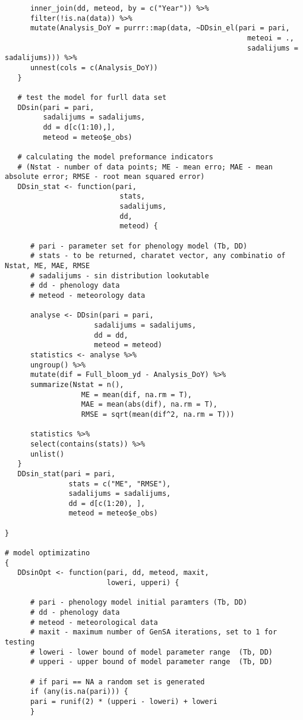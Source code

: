 \begin{verbatim}
      inner_join(dd, meteod, by = c("Year")) %>%
      filter(!is.na(data)) %>%
      mutate(Analysis_DoY = purrr::map(data, ~DDsin_el(pari = pari,
                                                         meteoi = .,
                                                         sadalijums = sadalijums))) %>%
      unnest(cols = c(Analysis_DoY))
   }

   # test the model for furll data set
   DDsin(pari = pari,
         sadalijums = sadalijums,
         dd = d[c(1:10),],
         meteod = meteo$e_obs)

   # calculating the model preformance indicators
   # (Nstat - number of data points; ME - mean erro; MAE - mean absolute error; RMSE - root mean squared error)
   DDsin_stat <- function(pari,
                           stats,
                           sadalijums,
                           dd,
                           meteod) {

      # pari - parameter set for phenology model (Tb, DD)
      # stats - to be returned, charatet vector, any combinatio of Nstat, ME, MAE, RMSE
      # sadalijums - sin distribution lookutable
      # dd - phenology data
      # meteod - meteorology data

      analyse <- DDsin(pari = pari,
                     sadalijums = sadalijums,
                     dd = dd,
                     meteod = meteod)
      statistics <- analyse %>%
      ungroup() %>%
      mutate(dif = Full_bloom_yd - Analysis_DoY) %>%
      summarize(Nstat = n(),
                  ME = mean(dif, na.rm = T),
                  MAE = mean(abs(dif), na.rm = T),
                  RMSE = sqrt(mean(dif^2, na.rm = T)))

      statistics %>%
      select(contains(stats)) %>%
      unlist()
   }
   DDsin_stat(pari = pari,
               stats = c("ME", "RMSE"),
               sadalijums = sadalijums,
               dd = d[c(1:20), ],
               meteod = meteo$e_obs)

}

# model optimizatino
{
   DDsinOpt <- function(pari, dd, meteod, maxit,
                        loweri, upperi) {

      # pari - phenology model initial paramters (Tb, DD)
      # dd - phenology data
      # meteod - meteorological data
      # maxit - maximum number of GenSA iterations, set to 1 for testing
      # loweri - lower bound of model parameter range  (Tb, DD)
      # upperi - upper bound of model parameter range  (Tb, DD)

      # if pari == NA a random set is generated
      if (any(is.na(pari))) {
      pari = runif(2) * (upperi - loweri) + loweri
      }


\end{verbatim}
